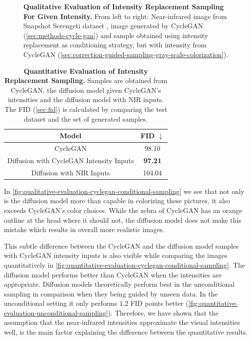 \begin{figure}[htp!]
\begin{tabularx}{\textwidth}{Y Y Y !{\space} Y Y Y}
    \end{tabularx}
    \caption{
        \textbf{Qualitative Evaluation of Intensity Replacement Sampling For Given Intensity.}
        From left to right:
        Near-infrared image from Snapshot Serengeti dataset \parencite{serengeti},
        image generated by CycleGAN (\autoref{sec:methods-cycle-gan})\parencite{mehri}
        and
        sample obtained using intensity replacement as conditioning strategy, but with intensity from CycleGAN (\autoref{sec:correction-guided-sampling-gray-scale-colorization}).
    }
    \label{fig:qualitative-evaluation-cyclegan-conditional-sampling}
\end{figure}

\begin{table}[htp!]
    \centering
    \begin{tabular}{c | c}
        Model                                    & FID  $\downarrow$ \\
        \hline\hline
        CycleGAN                                 & 98.10             \\
        Diffusion with CycleGAN Intensity Inputs & \textbf{97.21}    \\
        Diffusion with NIR Inputs                & 104.04
    \end{tabular}
    \caption{
        \textbf{Quantitative Evaluation of Intensity Replacement Sampling.}
        Samples are obtained from CycleGAN, the diffusion model given CycleGAN's intensities and the diffusion model with NIR inputs.
        The FID (\autoref{sec:fid}) \parencite{ttur} is calculated by comparing the test dataset and the set of generated samples.
    }
    \label{fig:quantitative-evaluation-cyclegan-conditional-sampling}
\end{table}


In \autoref{fig:qualitative-evaluation-cyclegan-conditional-sampling} we see that not only is the diffusion model more than capable in colorizing these pictures,
it also exceeds CycleGAN's color choices. While the zebra of CycleGAN has an orange outline at the head where it should not, the diffusion model does not make this mistake
which results in overall more realistic images.

This subtle difference between the CycleGAN and the diffusion model samples with CycleGAN intensity inputs is also visible while comparing the images quantitatively in \autoref{fig:quantitative-evaluation-cyclegan-conditional-sampling}.
The diffusion model performs better than CycleGAN when the intensities are appropriate.
Diffusion models theoretically perform best in the unconditional sampling in comparison when they being guided by unseen data.
In the unconditional setting it only performs $1.2$ FID points better (\autoref{fig:quantitative-evaluation-unconditional-sampling}).
Therefore, we have shown that the assumption that the near-infrared intensities approximate the visual intensities well,
is the main factor explaining the difference between the quantitative results.

